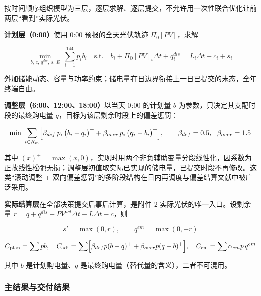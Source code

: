 按时间顺序组织模型为三层，逐层求解、逐层提交，不允许用一次性联合优化让前两层“看到”实际光伏。

\textbf{计划层（0:00）}使用 0:00 预报的全天光伏轨迹 $\Pi_0[PV]$，求解

\begin{equation}
\min_{b,\,c,\,q^{dis},\,s,\,E}\ \sum_{i=1}^{144}p_ib_i
\quad\text{s.t.}\quad
b_i+\Pi_0[PV]_i\Delta t+q^{dis}_i=L_i\Delta t+c_i+s_i
\end{equation}

外加储能动态、容量与功率约束；储电量在日边界衔接上一日已提交的末态，全年终端自由。

\textbf{调整层（6:00、12:00、18:00）}以当天 0:00 的计划量 $b$ 为参数，只决定其支配时段的最终购电量 $q$，目标为该层剩余时段上的偏差惩罚：

\begin{equation}
\min\ \sum_{i\in R_m}\Bigl[\beta_{def}\,p_i\,\bigl(b_i-q_i\bigr)^{+}+\beta_{over}\,p_i\,\bigl(q_i-b_i\bigr)^{+}\Bigr],
\qquad \beta_{def}=0.5,\ \ \beta_{over}=1.5
\end{equation}

其中 $(x)^+=\max(x,0)$，实现时用两个非负辅助变量分段线性化，因系数为正故线性松弛无损；调整层初值取实际已实现的储电量，已提交时段不再修改。这类“滚动调整 + 双向偏差惩罚”的多阶段结构在日内再调度与偏差结算文献中被广泛采用\cite{ref-li-2016-two-stage-rhc,ref-bhattacharya-2018-multistage-storage,ref-elkazaz-2020-convex-mpc-rhc,ref-danti-2019-intraday-rescheduling,ref-matsumoto-2022-imbalance-design,ref-asgarpoor-1995-deviation-penalty}。

\textbf{实际结算层}在全部决策提交后事后计算，是附件 2 实际光伏的唯一入口。设剩余量 $r=q+q^{dis}+PV^{act}\Delta t-L\Delta t-c$，则

\begin{equation}
s'=\max(0,r),\qquad q^{em}=\max(0,-r)
\end{equation}

\begin{equation}
C_{\text{plan}}=\sum p b,\quad
C_{\text{adj}}=\sum\Bigl[\beta_{def}p(b-q)^{+}+\beta_{over}p(q-b)^{+}\Bigr],\quad
C_{\text{em}}=\sum \alpha_{em}p\,q^{em}
\end{equation}

其中 $b$ 是计划购电量、$q$ 是最终购电量（替代量的含义），二者不可混用。

\subsubsection{主结果与交付结果}

